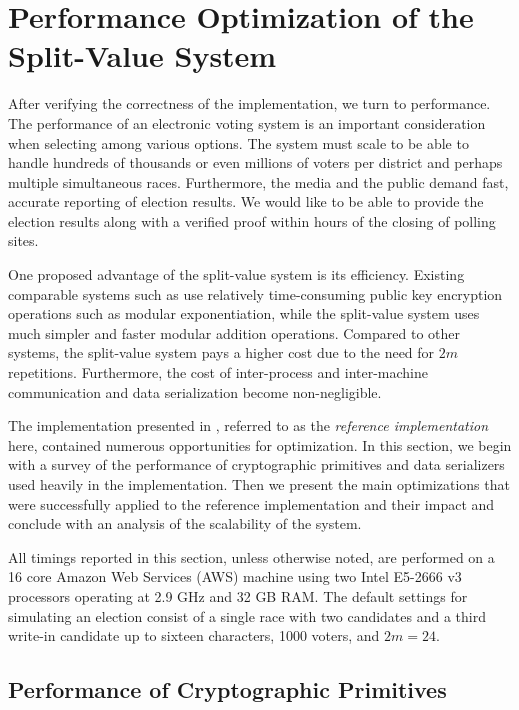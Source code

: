 \chapter{Performance Optimization of the Split-Value System} \label{perf}

After verifying the correctness of the implementation, we turn to performance. The performance of an electronic voting system is an important consideration when selecting among various options. The system must scale to be able to handle hundreds of thousands or even millions of voters per district and perhaps multiple simultaneous races. Furthermore, the media and the public demand fast, accurate reporting of election results. We would like to be able to provide the election results along with a verified proof within hours of the closing of polling sites.

One proposed advantage of the split-value system is its efficiency. Existing comparable systems such as \cite{starvote} use relatively time-consuming public key encryption operations such as modular exponentiation, while the split-value system uses much simpler and faster modular addition operations. Compared to other systems, the split-value system pays a higher cost due to the need for $2m$ repetitions. Furthermore, the cost of inter-process and inter-machine communication and data serialization become non-negligible.

The implementation presented in \cite{marco}, referred to as the \emph{reference implementation} here, contained numerous opportunities for optimization. In this section, we begin with a survey of the performance of cryptographic primitives and data serializers used heavily in the implementation. Then we present the main optimizations that were successfully applied to the reference implementation and their impact and conclude with an analysis of the scalability of the system.

All timings reported in this section, unless otherwise noted, are performed on a 16 core Amazon Web Services (AWS) machine using two Intel E5-2666 v3 processors operating at 2.9 GHz and 32 GB RAM. The default settings for simulating an election consist of a single race with two candidates and a third write-in candidate up to sixteen characters, 1000 voters, and $2m = 24$.

\section{Performance of Cryptographic Primitives} \label{perf:crypto}

